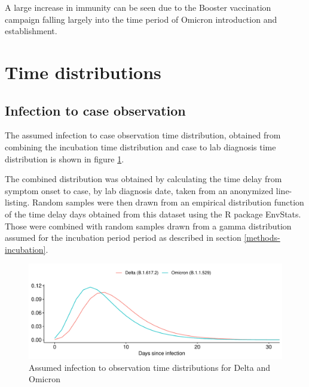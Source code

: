 \documentclass[
]{article}
\begin{document}
A large increase in immunity can be seen due to the Booster vaccination campaign
falling largely into the time period of Omicron introduction and establishment.

\hypertarget{time-distributions}{%
\section{Time distributions}\label{time-distributions}}

\hypertarget{infection-to-case-observation}{%
\subsection{Infection to case observation}\label{infection-to-case-observation}}

The assumed infection to case observation time distribution, obtained from combining the
incubation time distribution and case to lab diagnosis time distribution is shown in
figure \ref{fig:i2o-delta-omicron}.

The combined distribution was obtained by calculating the time delay from symptom onset
to case, by lab diagnosis date, taken from an anonymized line-listing. Random samples were
then drawn from an empirical distribution function of the time delay days obtained
from this dataset using the R package EnvStats. Those were combined with random
samples drawn from a gamma distribution assumed for the incubation period period
as described in section \ref{methods-incubation}.

\begin{figure}

{\centering \includegraphics[width=0.75\linewidth]{omicron_austria_files/figure-latex/i2o-delta-omicron-1} 

}

\caption{Assumed infection to observation time distributions for Delta and Omicron}\label{fig:i2o-delta-omicron}
\end{figure}

\printbibliography[title=References]
\end{document}
